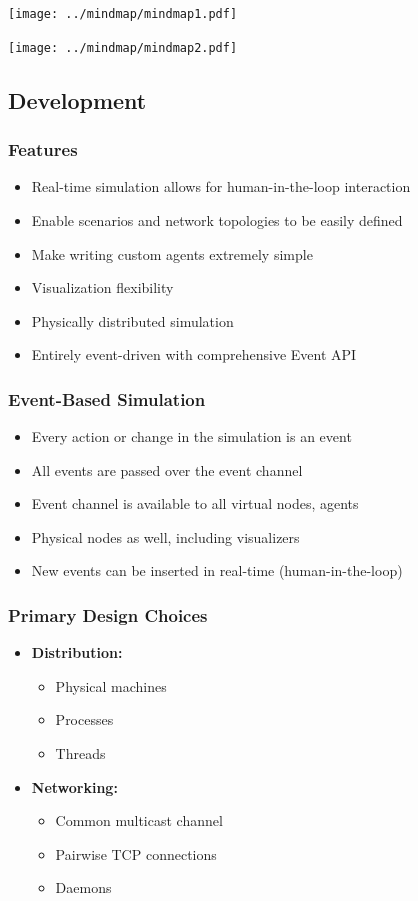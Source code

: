 \documentclass[mathserif,usenames,dvipsnames]{beamer}
\begin{document}
\frame
{
    \begin{center}
        \texttt{[image: ../mindmap/mindmap1.pdf]}
    \end{center}
}

\frame
{
    \begin{center}
        \texttt{[image: ../mindmap/mindmap2.pdf]}
    \end{center}
}
\subsection{Development}

\frame
{
    \frametitle{Features}
    \begin{itemize}
        \item Real-time simulation allows for human-in-the-loop interaction
        \item Enable scenarios and network topologies to be easily defined
        \item Make writing custom agents extremely simple
        \item Visualization flexibility
        \item Physically distributed simulation
        \item Entirely event-driven with comprehensive Event API
    \end{itemize}
}

\frame
{
    \frametitle{Event-Based Simulation}
    \begin{itemize}
        \item Every action or change in the simulation is an event
        \item All events are passed over the event channel
        \item Event channel is available to all virtual nodes, agents
        \item Physical nodes as well, including visualizers
        \item New events can be inserted in real-time (human-in-the-loop)
    \end{itemize}
}

\frame
{
    \frametitle{Primary Design Choices}
    \begin{itemize}
        \item \textbf{Distribution:}
        \begin{itemize}
            \item Physical machines
            \item Processes
            \item Threads
        \end{itemize}
        \item \textbf{Networking:} 
        \begin{itemize}
            \item Common multicast channel
            \item Pairwise TCP connections
            \item Daemons
        \end{itemize}
    \end{itemize}
}
\end{document}
